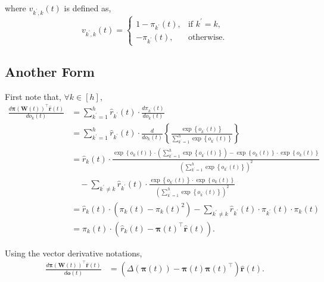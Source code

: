 \documentclass[10pt]{article}
\def\rvo{{\mathbf{o}}}
\def\rvr{{\mathbf{r}}}
\def\rvo{{\mathbf{o}}}
\def\rvpi{{\boldsymbol{\pi}}}
\def\rmW{{\mathbf{W}}}
\begin{document}
where $v_{k^\prime,k}(t)$ is defined as,
\begin{equation*}
	v_{k^\prime,k}(t) = \begin{cases}
    1 - \pi_{k^\prime}(t), & \text{if $k^\prime = k$}, \\
    - \pi_{k^\prime}(t), & \text{otherwise}.
  \end{cases}
\end{equation*}

\subsection{Another Form}

First note that, $\forall k \in [h]$,
\begin{equation*}
\begin{split}
    \frac{d \rvpi\left( \rmW(t) \right)^\top \hat{\rvr}\left(t\right)}{d o_k(t)} &= \sum\limits_{k^\prime = 1}^{h}{ \hat{r}_{k^\prime}\left(t\right) \cdot \frac{d \pi_{k^\prime}(t) }{d o_k(t)}} \\
    &= \sum\limits_{k^\prime = 1}^{h}{ \hat{r}_{k^\prime}\left(t\right) \cdot \frac{d }{d o_k(t)}} \left\{ \frac{\exp\left\{ o_{k^\prime}(t) \right\}}{\sum\limits_{k^\prime = 1}^{h}{\exp\left\{ o_{k^\prime}(t) \right\}}} \right\} \\
    &= \hat{r}_{k}\left(t\right) \cdot \frac{ \exp\left\{ o_k(t) \right\} \cdot \left( \sum\limits_{k^\prime = 1}^{h}{\exp\left\{ o_{k^\prime}(t) \right\}} \right) - \exp\left\{ o_k(t) \right\} \cdot \exp\left\{ o_k(t) \right\} }{ \left( \sum\limits_{k^\prime = 1}^{h}{\exp\left\{ o_{k^\prime}(t) \right\}} \right)^2 } \\
    &\quad - \sum\limits_{k^\prime \not= k}{ \hat{r}_{k^\prime}\left(t\right) \cdot \frac{\exp\left\{ o_{k^\prime}(t) \right\} \cdot \exp\left\{ o_k(t) \right\} }{ \left( \sum\limits_{k^\prime = 1}^{h}{\exp\left\{ o_{k^\prime}(t) \right\}} \right)^2 }} \\
    &= \hat{r}_{k}\left(t\right) \cdot \left( \pi_k(t) - \pi_k(t)^2 \right) - \sum\limits_{k^\prime \not= k}{ \hat{r}_{k^\prime}\left(t\right) \cdot \pi_{k^\prime}(t) \cdot \pi_k(t) } \\
    &= \pi_k(t) \cdot \left( \hat{r}_{k}\left(t\right) - \rvpi(t)^\top \hat{\rvr}\left(t\right) \right).
\end{split}
\end{equation*}

\noindent Using the vector derivative notations,
\begin{equation*}
\begin{split}
    \frac{d \rvpi\left( \rmW(t) \right)^\top \hat{\rvr}\left(t\right)}{d \rvo(t)} &= \left( \Delta\left( \rvpi(t) \right) - \rvpi(t) \rvpi(t)^\top \right) \hat{\rvr}\left(t\right).
\end{split}
\end{equation*}
\end{document}
